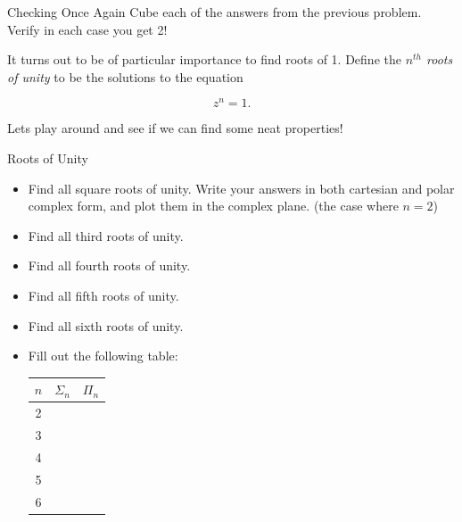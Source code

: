 \begin{exercise}{Checking Once Again \Coffeecup \Coffeecup}
Cube each of the answers from the previous problem.  Verify in each case you get 2!
\vspace*{3in}
\end{exercise}

It turns out to be of particular importance to find roots of 1.  Define the \emph{$n^{th}$ roots of unity } to be the solutions to the equation  

$$ z^n =1. $$

Lets play around and see if we can find some neat properties!
\begin{exercise}{Roots of Unity \Coffeecup \Coffeecup \Coffeecup \Coffeecup}
\begin{itemize}

\item Find all square roots of unity.  Write your answers in both cartesian and polar complex form, and plot them in the complex plane.  (the case where $n=2$)

\vspace*{2in}

\item Find all third roots of unity.
\vspace*{2in}

\item Find all fourth roots of unity.

\vspace*{1.5in}

\item Find all fifth roots of unity.

\vspace*{1.5in}

\item Find all sixth roots of unity.

\vspace*{1.5in}

\item Fill out the following table:
\begin{center}
\begin{tabular}{|c|c|c|}
 \hline
  $n$ & $\Sigma_n$ & $\Pi_n$ \\
  \hline \hline  
  2 & \hspace{.2in} & \hspace{.2in} \\   \hline
  3 & \hspace{.2in} & \hspace{.2in} \\   \hline
  4 & \hspace{.2in} & \hspace{.2in} \\   \hline
  5 & \hspace{.2in} & \hspace{.2in} \\   \hline
  6 & \hspace{.2in} & \hspace{.2in} \\   \hline
  \hline
\end{tabular}
\end{center}


\end{itemize}
\end{exercise}
